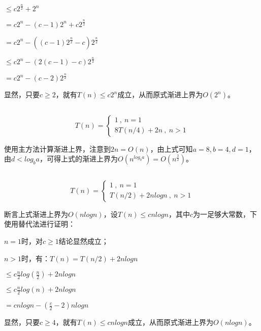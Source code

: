 \documentclass{article}
\begin{document}
\qquad\qquad\qquad\qquad\qquad\quad$\le{c}2^\frac{n}{2}+2^n$

\qquad\qquad\qquad\qquad\qquad\quad$=c2^n-(c-1)2^n+c2^\frac{n}{2}$

\qquad\qquad\qquad\qquad\qquad\quad$=c2^n-((c-1)2^\frac{n}{2}-c)2^\frac{n}{2}$

\qquad\qquad\qquad\qquad\qquad\quad$\le{c}2^n-(2(c-1)-c)2^\frac{n}{2}$

\qquad\qquad\qquad\qquad\qquad\quad$=c2^n-(c-2)2^\frac{n}{2}$

显然，只要$c\ge2$，就有$T(n)\le{c2^n}$成立，从而原式渐进上界为$O(2^n)$。

\subsection{}

$$
T(n)=\left\{
\begin{array}{l}
1\ ,\ n=1\\
8T(n/4)+2n\ ,\ n>1
\end{array}
\right.
$$

使用主方法计算渐进上界，注意到$2n=O(n)$，由上式可知$a=8,b=4,d=1$，由$d<log_b a$，可得上式的渐进上界为$O(n^{log_b a})=O(n^\frac{3}{2})$。

\subsection{}

$$
T(n)=\left\{
\begin{array}{l}
1\ ,\ n=1\\
T(n/2)+2n log n\ ,\ n>1
\end{array}
\right.
$$

断言上式渐进上界为$O(n log n)$，设$T(n)\le{c n log n}$，其中$c$为一足够大常数，下使用替代法进行证明：

\qquad$n=1$时，对$c\ge1$结论显然成立；

\qquad$n>1$时，有：$T(n)=T(n/2)+2n log n$

\qquad\qquad\qquad\qquad\qquad\quad$\le{c}\frac{n}{2}log(\frac{n}{2})+2n log n$

\qquad\qquad\qquad\qquad\qquad\quad$\le{c}\frac{n}{2}log(n)+2n log n$

\qquad\qquad\qquad\qquad\qquad\quad$=c n log n-(\frac{c}{2}-2)n log n$

显然，只要$c\ge4$，就有$T(n)\le{c n log n}$成立，从而原式渐进上界为$O(n log n)$。

\subsection{}
\end{document}
